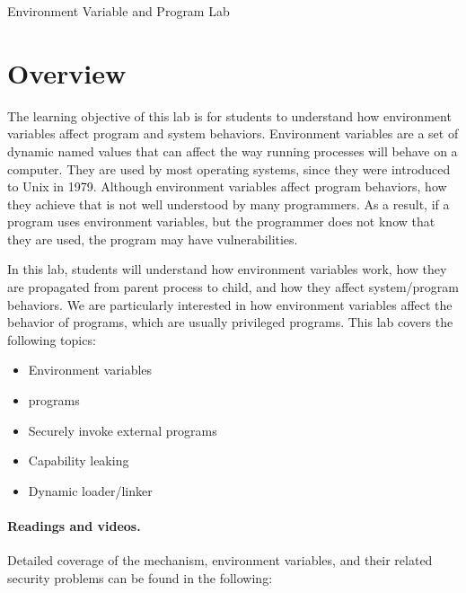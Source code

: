 







\begin{center}
{\LARGE Environment Variable and \setuid Program Lab}
\end{center}



\section{Overview}

The learning objective of this lab is for students to understand how
environment variables affect program and system behaviors. Environment
variables are a set of dynamic named values that can affect the way running processes
will behave on a computer. They are used by most operating systems, since
they were introduced to Unix in 1979. Although environment variables affect
program behaviors, how they achieve that is not well understood by many
programmers. As a result, if a program uses  environment
variables,  but the programmer does not know that they are used, the program
may have vulnerabilities. 

In this lab, students will understand how
environment variables work, how they are propagated from parent process to
child, and how they affect system/program behaviors. We are particularly
interested in how environment variables affect the behavior of \setuid
programs, which are usually privileged programs.  
This lab covers the following topics:

\begin{itemize}[noitemsep]
\item Environment variables
\item \setuid programs
\item Securely invoke external programs
\item Capability leaking
\item Dynamic loader/linker
\end{itemize}


\paragraph{Readings and videos.}
Detailed coverage of the \setuid mechanism, environment variables,
and their related security problems can be found in the following:

